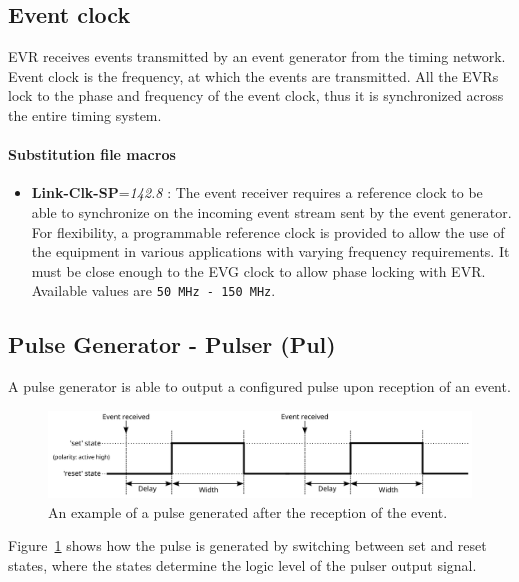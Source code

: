\documentclass[12pt,a4paper]{article}
\begin{document}
\subsection{Event clock}\label{sec:Events and event clock}
EVR receives events transmitted by an event generator from the timing network. Event clock is the frequency, at which the events are transmitted. All the EVRs lock to the phase and frequency of the event clock, thus it is synchronized across the entire timing system.

\paragraph{Substitution file macros}
\begin{itemize}
\item
	\textbf{Link-Clk-SP}=\emph{142.8} : The event receiver requires a
reference clock to be able to synchronize on the incoming event
stream sent by the event generator. For flexibility, a programmable
reference clock is provided to allow the use of the equipment in
various applications with varying frequency requirements. It must be
close enough to the EVG clock to allow phase locking with
EVR. Available values are \texttt{50~MHz - 150~MHz}. 
\end{itemize}

\subsection{Pulse Generator - Pulser (Pul)}\label{sec:Pulser}
A pulse generator is able to output a configured pulse upon reception of an event.
\begin{figure}[H]
	\centering
	\includegraphics[width=\columnwidth]{./img/pulserGeneric}
	\caption{An example of a pulse generated after the reception of the event.}
	\label{fig:pulser_generic}
\end{figure}
Figure~\ref{fig:pulser_generic} shows how the pulse is generated by switching between set and reset states, where the states determine the logic level of the pulser output signal.
\end{document}
